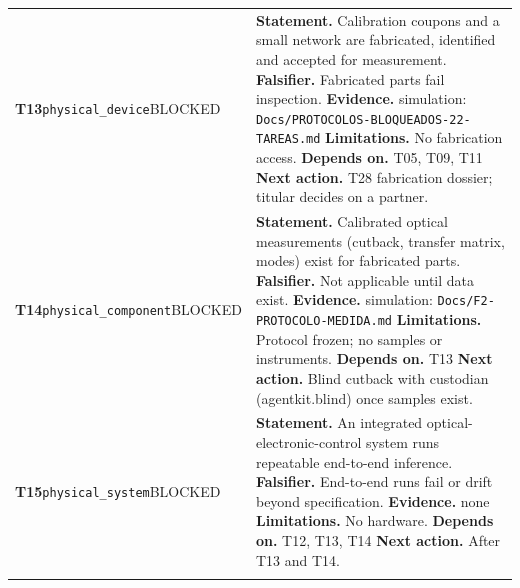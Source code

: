 \begin{longtable}{@{}>{\raggedright\arraybackslash}p{2.35cm}>{\raggedright\arraybackslash}p{13.2cm}@{}}
\textbf{T13}\newline \texttt{physical\_\allowbreak{}device}\newline BLOCKED & \textbf{Statement.} Calibration coupons and a small network are fabricated, identified and accepted for measurement. \newline \textbf{Falsifier.} Fabricated parts fail inspection. \newline \textbf{Evidence.} simulation: \texttt{Docs/\allowbreak{}PROTOCOLOS-BLOQUEADOS-22-TAREAS.md} \newline \textbf{Limitations.} No fabrication access. \newline \textbf{Depends on.} T05, T09, T11 \newline \textbf{Next action.} T28 fabrication dossier; titular decides on a partner. \\ \addlinespace[2pt]
\textbf{T14}\newline \texttt{physical\_\allowbreak{}component}\newline BLOCKED & \textbf{Statement.} Calibrated optical measurements (cutback, transfer matrix, modes) exist for fabricated parts. \newline \textbf{Falsifier.} Not applicable until data exist. \newline \textbf{Evidence.} simulation: \texttt{Docs/\allowbreak{}F2-PROTOCOLO-MEDIDA.md} \newline \textbf{Limitations.} Protocol frozen; no samples or instruments. \newline \textbf{Depends on.} T13 \newline \textbf{Next action.} Blind cutback with custodian (agentkit.blind) once samples exist. \\ \addlinespace[2pt]
\textbf{T15}\newline \texttt{physical\_\allowbreak{}system}\newline BLOCKED & \textbf{Statement.} An integrated optical-electronic-control system runs repeatable end-to-end inference. \newline \textbf{Falsifier.} End-to-end runs fail or drift beyond specification. \newline \textbf{Evidence.} none \newline \textbf{Limitations.} No hardware. \newline \textbf{Depends on.} T12, T13, T14 \newline \textbf{Next action.} After T13 and T14. \\ \addlinespace[2pt]

\end{longtable}
